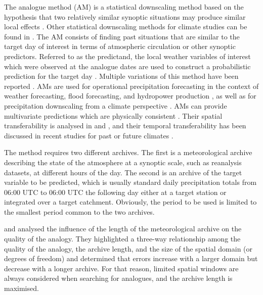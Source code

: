 \documentclass[hess, manuscript]{copernicus}
\providecommand{\DIFadd}[1]{{\protect\color{blue}\uwave{#1}}} %
\providecommand{\DIFaddbegin}{} %
\providecommand{\DIFaddend}{} %
\begin{document}
	
	
	\introduction  %
	\label{sec:introduction}

	The analogue method (AM) is a statistical downscaling method based on the hypothesis that two relatively similar synoptic situations may produce similar local effects \citep{Lorenz1956, Lorenz1969}. Other statistical downscaling methods for climate studies can be found in \citet{Maraun2010}. The AM consists of finding past situations that are similar to the target day of interest in terms of atmospheric circulation or other synoptic predictors. Referred to as the predictand, the local weather variables of interest which were observed at the analogue dates are used to construct a probabilistic prediction for the target day \citep{Duband1970, Zorita1999}. Multiple variations of this method have been reported \citep{BenDaoud2016}. AMs are used for operational precipitation forecasting in the context of weather forecasting, flood forecasting, and hydropower production \citep[e.g.,][]{Bontron2005, Hamill2006, Desaint2008a, GarciaHernandez2009b, Bliefernicht2010, Marty2010, Marty2012, Horton2012, Obled2014, Hamill2015, BenDaoud2016}, as well as for precipitation downscaling from a climate perspective \citep[e.g.][]{Radanovics2013, Chardon2014, Dayon2015}. AMs can provide multivariate predictions which are physically consistent \citep{Raynaud2016b}. Their spatial transferability is analysed in \citet{Chardon2014} and \citet{Radanovics2013}, and their temporal transferability has been discussed in recent studies for past or future climates \citep{Dayon2015, Caillouet2016}.

	The method requires two different archives. The first is a meteorological archive describing the state of the atmosphere at a synoptic scale, such as reanalysis datasets, at different hours of the day. The second is an archive of the target variable to be predicted, which is usually standard daily precipitation totals from 06:00 \DIFaddbegin \DIFadd{h }\DIFaddend UTC to 06:00 \DIFaddbegin \DIFadd{h }\DIFaddend UTC the following day either at a target station or integrated over a target catchment. Obviously, the period to be used is limited to the smallest period common to the two archives.

	\citet{Ruosteenoja1988} and \citet{Vandendool1994} analysed the influence of the length of the meteorological archive on the quality of the analogy. They highlighted a three-way relationship among the quality of the analogy, the archive length, and the size of the spatial domain (or degrees of freedom) and determined that errors increase with a larger domain but decrease with a longer archive. For that reason, limited spatial windows are always considered when searching for analogues, and the archive length is maximised. 
\end{document}
